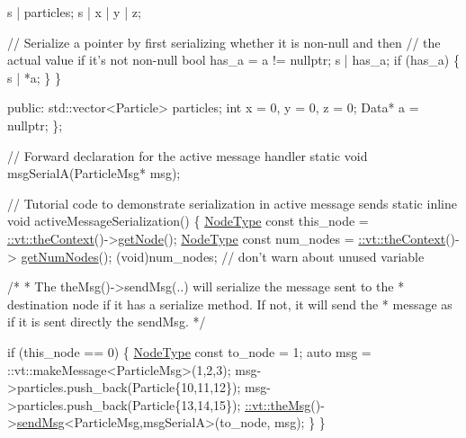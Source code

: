 \begin{DoxyCodeInclude}
    s | particles;
    s | x | y | z;

    \textcolor{comment}{// Serialize a pointer by first serializing whether it is non-null and then}
    \textcolor{comment}{// the actual value if it's not non-null}
    \textcolor{keywordtype}{bool} has\_a = a != \textcolor{keyword}{nullptr};
    s | has\_a;
    \textcolor{keywordflow}{if} (has\_a) \{
      s | *a;
    \}
  \}

\textcolor{keyword}{public}:
  std::vector<Particle> particles;
  \textcolor{keywordtype}{int} x = 0, y = 0, z = 0;
  Data* a = \textcolor{keyword}{nullptr};
\};

\textcolor{comment}{// Forward declaration for the active message handler}
\textcolor{keyword}{static} \textcolor{keywordtype}{void} msgSerialA(ParticleMsg* msg);

\textcolor{comment}{// Tutorial code to demonstrate serialization in active message sends}
\textcolor{keyword}{static} \textcolor{keyword}{inline} \textcolor{keywordtype}{void} activeMessageSerialization() \{
  \hyperlink{namespacevt_a866da9d0efc19c0a1ce79e9e492f47e2}{NodeType} \textcolor{keyword}{const} this\_node = \hyperlink{namespacevt_a26551fe0e6e6a1371111df5b12c7e92c}{::vt::theContext}()->\hyperlink{structvt_1_1ctx_1_1_context_a0d52c263ce8516546a67443d9a86fa5f}{getNode}();
  \hyperlink{namespacevt_a866da9d0efc19c0a1ce79e9e492f47e2}{NodeType} \textcolor{keyword}{const} num\_nodes = \hyperlink{namespacevt_a26551fe0e6e6a1371111df5b12c7e92c}{::vt::theContext}()->
      \hyperlink{structvt_1_1ctx_1_1_context_a7f41071aadf6d5fa9e1b6c703c5ff19d}{getNumNodes}();
  (void)num\_nodes;  \textcolor{comment}{// don't warn about unused variable}

  \textcolor{comment}{/*}
\textcolor{comment}{   * The theMsg()->sendMsg(..) will serialize the message sent to the}
\textcolor{comment}{   * destination node if it has a serialize method. If not, it will send the}
\textcolor{comment}{   * message as if it is sent directly the sendMsg.}
\textcolor{comment}{   */}

  \textcolor{keywordflow}{if} (this\_node == 0) \{
    \hyperlink{namespacevt_a866da9d0efc19c0a1ce79e9e492f47e2}{NodeType} \textcolor{keyword}{const} to\_node = 1;
    \textcolor{keyword}{auto} msg = ::vt::makeMessage<ParticleMsg>(1,2,3);
    msg->particles.push\_back(Particle\{10,11,12\});
    msg->particles.push\_back(Particle\{13,14,15\});
    \hyperlink{namespacevt_aeafd31f866aeb4dc6fc2f6ee97136350}{::vt::theMsg}()->\hyperlink{group__preregister_ga0162a39473e7f9b490a79a7983d949ac}{sendMsg}<ParticleMsg,msgSerialA>(to\_node, msg);
  \}
\}


\end{DoxyCodeInclude}
